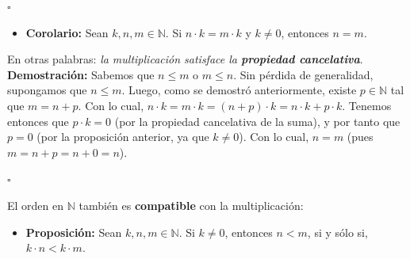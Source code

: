 \documentclass[10 pt]{article}
\begin{document}
\begin{flushright}
    $\square$
\end{flushright}

\begin{itemize}
    \item \Large{\textbf{Corolario:} Sean $k,n,m \in \mathbb N$. Si $n \cdot k=m \cdot k$ y $k \neq 0$, entonces $n=m$.} \\
\end{itemize}

\Large{En otras palabras: \textit{la multiplicación satisface la \textbf{propiedad cancelativa}}.} \\

\Large{\textbf{Demostración:} Sabemos que $n \leq m$ o $m \leq n$. Sin pérdida de generalidad, supongamos que $n \leq m$. Luego, como se demostró anteriormente, existe $p \in \mathbb N$ tal que $m=n+p$. Con lo cual, $n \cdot k=m \cdot k=(n+p) \cdot k=n \cdot k+p \cdot k$. Tenemos entonces que $p \cdot k=0$ (por la propiedad cancelativa de la suma), y por tanto que $p=0$ (por la proposición anterior, ya que $k \neq 0$). Con lo cual, $n=m$ (pues $m=n+p=n+0=n$).} \\

\begin{flushright}
    $\square$
\end{flushright}

\Large{El orden en $\mathbb N$ también es \textbf{compatible} con la multiplicación:} \\

\begin{itemize}
    \item \Large{\textbf{Proposición:} Sean $k,n,m \in \mathbb N$. Si $k \neq 0$, entonces $n<m$, si y sólo si, $k \cdot n<k \cdot m$.} \\
\end{itemize}
\end{document}
